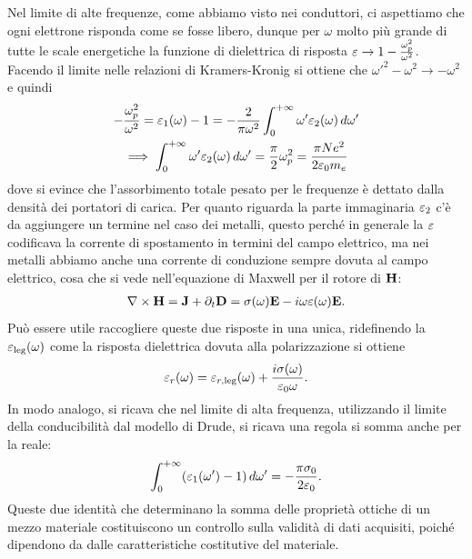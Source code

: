 Nel limite di alte frequenze, come abbiamo visto nei conduttori, ci aspettiamo che ogni elettrone risponda come se fosse libero, dunque per 
$ \omega $ molto più grande di tutte le scale energetiche la funzione di dielettrica di risposta $ \varepsilon \to 1 - \frac{\omega_p^2}{\omega^2} $. Facendo 
il limite nelle relazioni di Kramers-Kronig si ottiene che $ \omega'^2 - \omega^2 \to - \omega^2 $ e quindi
\begin{gather}
  - \frac{\omega_p^2}{\omega^2} = \varepsilon_1(\omega) - 1 = - \frac{2}{\pi \omega^2} \int_{0}^{+\infty} \omega' \varepsilon_2(\omega) \,d\omega' 
  \\ 
  \implies \int_{0}^{+\infty} \omega' \varepsilon_2(\omega) \,d\omega' = \frac\pi{2} {\omega_p^2} = \frac{ \pi N e^2 }{2 \varepsilon_0 m_e}
\end{gather}
dove si evince che l'assorbimento totale pesato per le frequenze è dettato dalla densità dei portatori di carica. 
Per quanto riguarda la parte immaginaria $ \varepsilon_2 $ c'è da aggiungere un termine nel caso dei metalli, questo perché in generale la $ \varepsilon $ codificava 
la corrente di spostamento in termini del campo elettrico, ma nei metalli abbiamo anche una corrente di conduzione sempre dovuta al campo elettrico, cosa 
che si vede nell'equazione di Maxwell per il rotore di $ \mathbf{H} $:
\begin{align}
  \nabla \times \mathbf{H} = \mathbf{J} + \partial_t \mathbf{D} = \sigma(\omega) \mathbf{E} - i\omega \varepsilon(\omega) \mathbf{E}.
\end{align}
Può essere utile raccogliere queste due risposte in una unica, ridefinendo la $ \varepsilon_{\text{leg}}(\omega) $ come la risposta dielettrica dovuta alla 
polarizzazione si ottiene
\begin{align}
  \varepsilon_r(\omega) = \varepsilon_{r, \text{leg}}(\omega) + \frac{i \sigma(\omega)}{\varepsilon_0 \omega}.
\end{align}
In modo analogo, si ricava che nel limite di alta frequenza, utilizzando il limite della conducibilità dal modello di Drude, si ricava 
una regola si somma anche per la reale:
\begin{align}
  \int_{0}^{+\infty} (\varepsilon_1(\omega') - 1) \,d\omega' = - \frac{\pi \sigma_0}{2 \varepsilon_0 }.
\end{align}
Queste due identità che determinano la somma delle proprietà ottiche di un mezzo materiale costituiscono un controllo sulla validità di dati acquisiti, 
poiché dipendono da dalle caratteristiche costitutive del materiale.




